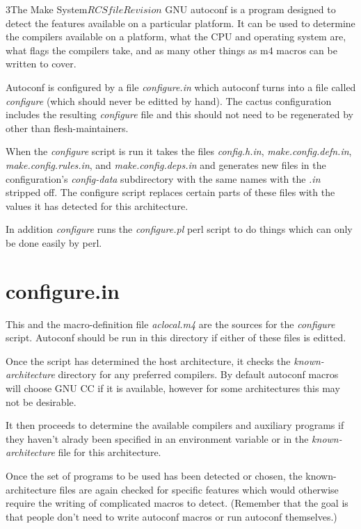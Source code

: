 \begin{cactuspart}{3}{The Make System}{$RCSfile$}{$Revision$}
GNU autoconf is a program designed to detect the features available
on a particular platform.  It can be used to determine the 
compilers available on a platform, what the CPU and operating 
system are, what flags the compilers take, and as many other things
as m4 macros can be written to cover.

Autoconf is configured by a file {\em configure.in} which autoconf
turns into a file called {\em configure} (which should never be
editted by hand).  The cactus configuration includes the resulting
{\em configure} file and this should not need to be regenerated by
other than flesh-maintainers.

When the {\em configure} script is run it takes the files
{\em config.h.in}, {\em make.config.defn.in}, {\em make.config.rules.in},
and {\em make.config.deps.in} and generates new files in the 
configuration's {\em config-data} subdirectory with the same names with the
{\em .in} stripped off.  The configure script replaces certain parts of these
files with the values it has detected for this architecture.

In addition {\em configure} runs the {\em configure.pl} perl script to
do things which can only be done easily by perl.

\section{configure.in}
\label{sec:autoconf:configure}

This and the macro-definition file {\em aclocal.m4} are the 
sources for the {\em configure} script.  Autoconf should be
run in this directory if either of these files is editted.

Once the script has determined the host architecture, it checks
the {\em known-architecture} directory for any preferred 
compilers.  By default autoconf macros will choose GNU CC if
it is available, however for some architectures this may not be
desirable.

It then proceeds to determine the available compilers and auxiliary
programs if they haven't alrady been specified in an environment variable
or in the {\em known-architecture} file for this architecture.

Once the set of programs to be used has been detected or chosen, the
known-architecture files are again checked for specific features
which would otherwise require the writing of complicated macros to detect.
(Remember that the goal is that people don't need to write autoconf macros
or run autoconf themselves.)


\end{cactuspart}
